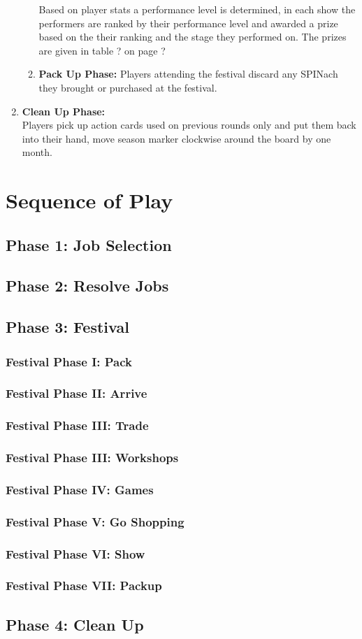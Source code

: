 \begin{enumerate}
\begin{enumerate}[I]
		Based on player stats a performance level is determined, in each show the performers are ranked by their performance level and awarded a prize based on the their ranking and the stage they performed on. 
		The prizes are given in table ? on page ?
		\item \textbf{Pack Up Phase:} Players attending the festival discard any SPINach they brought or purchased at the festival.
	\end{enumerate}
	\item \textbf{Clean Up Phase:} \hfill \\
	Players pick up action cards used on previous rounds only and put them back into their hand, move season marker clockwise around the board by one month.
\end{enumerate}
\section{Sequence of Play}
\subsection{Phase 1: Job Selection}
\subsection{Phase 2: Resolve Jobs}
\subsection{Phase 3: Festival}
\subsubsection{Festival Phase I: Pack}
\subsubsection{Festival Phase II: Arrive}
\subsubsection{Festival Phase III: Trade}
\subsubsection{Festival Phase III: Workshops}
\subsubsection{Festival Phase IV: Games}
\subsubsection{Festival Phase V: Go Shopping}
\subsubsection{Festival Phase VI: Show}
\subsubsection{Festival Phase VII: Packup}
\subsection{Phase 4: Clean Up}